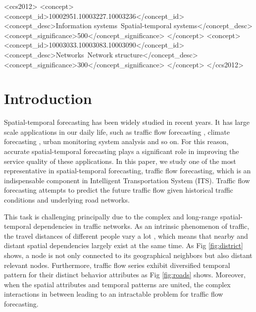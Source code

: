 \documentclass[sigconf]{acmart}
\theoremstyle{definition}
\begin{document}
\begin{CCSXML}
<ccs2012>
<concept>
<concept_id>10002951.10003227.10003236</concept_id>
<concept_desc>Information systems~Spatial-temporal systems</concept_desc>
<concept_significance>500</concept_significance>
</concept>
<concept>
<concept_id>10003033.10003083.10003090</concept_id>
<concept_desc>Networks~Network structure</concept_desc>
<concept_significance>300</concept_significance>
</concept>
</ccs2012>
\end{CCSXML}




\maketitle

\section{Introduction}
Spatial-temporal forecasting has been widely studied in recent years. It has large scale applications in our daily life, such as traffic flow forecasting \cite{guo2019attention, du2017traffic}, climate forecasting \cite{jones2017machine, buizer2016making}, urban monitoring system analysis \cite{longo2017crowd} and so on. For this reason, accurate spatial-temporal forecasting plays a significant role in improving the service quality of these applications. In this paper, we study one of the most representative in spatial-temporal forecasting, traffic flow forecasting, which is an indispensable component in Intelligent Transportation System (ITS). Traffic flow forecasting attempts to predict the future traffic flow given historical traffic conditions and underlying road networks.



This task is challenging principally due to the complex and long-range spatial-temporal dependencies in traffic networks. As an intrinsic phenomenon of traffic, the travel distances of different people vary a lot \cite{plotz2017distribution}, which means that nearby and distant spatial dependencies largely exist at the same time. As Fig \ref{fig:district} shows, a node is not only connected to its geographical neighbors but also distant relevant nodes. Furthermore, traffic flow series exhibit diversified temporal pattern for their distinct behavior attributes as Fig \ref{fig:roads} shows. Moreover, when the spatial attributes and temporal patterns are united, the complex interactions in between leading to an intractable problem for traffic flow forecasting.
\end{document}
